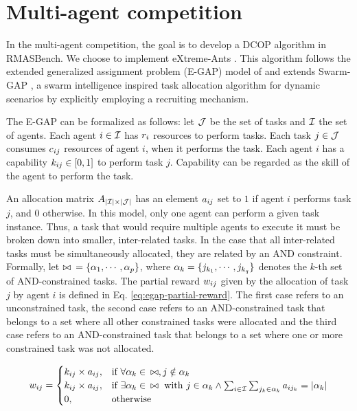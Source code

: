 \section{Multi-agent competition}
\label{sec:multi-agent}

In the multi-agent competition, the goal is to develop a DCOP algorithm in RMASBench. We choose to implement eXtreme-Ants \citep{Santos&Bazzan2009optmas}. This algorithm follows the extended generalized assignment problem (E-GAP) model of \citep{Scerri+2005} and extends Swarm-GAP \citep{Ferreira+2008ccmms}, a swarm intelligence inspired task allocation algorithm for dynamic scenarios by explicitly employing a recruiting mechanism.

The E-GAP can be formalized as follows: let $\mathcal{J}$ be the set of tasks and $\mathcal{I}$ the set of agents. Each agent $i \in \mathcal{I}$ has $r_{i}$ resources to perform tasks. Each task $j \in \mathcal{J}$ consumes $c_{ij}$ resources of agent $i$, when it performs the task. Each agent $i$ has a capability $k_{ij} \in [0,1]$ to perform task $j$. Capability can be regarded as the skill of the agent to perform the task. %

An allocation matrix $A_{|\mathcal{I}| \times |\mathcal{J}|}$ has an element $a_{ij}$ set to $1$ if agent $i$ performs task $j$, and 0 otherwise. In this model, only one agent can perform a given task instance. Thus, a task that would require multiple agents to execute it must be broken down into smaller, inter-related tasks. In the case that all inter-related tasks must be simultaneously allocated, they are related by an AND constraint. 
Formally, let  $\bowtie \enspace = \{\alpha_{1},\cdots,\alpha_{p} \}$, where $\alpha_{k} = \{j_{k_1},\cdots,j_{k_q}\}$ denotes the $k$-th set of AND-constrained tasks. The partial reward $w_{ij}$ given by the allocation of task $j$ by agent $i$ is defined in Eq. \ref{eq:egap-partial-reward}. The first case refers to an unconstrained task, the second case refers to an AND-constrained task that belongs to a set where all other constrained tasks were allocated and the third case refers to an AND-constrained task that belongs to a set where one or more constrained task was not allocated.

\begin{equation}
\label{eq:egap-partial-reward}
\partialrwd{i}{j} = 
\begin{cases}
  \agtcap{i}{j} \times \allocate{i}{j} ,& \text{if } \forall\andtasks{k} \in \enspace \allandtasks, j \notin \andtasks{k}\\
  \agtcap{i}{j} \times \allocate{i}{j} ,& \text{if } \exists\andtasks{k} \in \enspace \allandtasks \text{ with } j \in \andtasks{k} \wedge \sum_{i \in \agentset}\sum_{j_k \in \andtasks{k}} \allocate{i}{j_k} = |\andtasks{k}| %
  \\
  0,& \text{otherwise}
\end{cases}
\end{equation}


